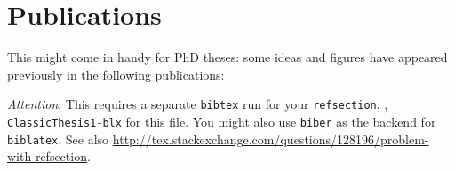 \chapter*{Publications}
This might come in handy for PhD theses: some ideas and figures have appeared previously in the following publications:


\begin{refsection}[ownpubs]
    \small
    \nocite{*} %
    \printbibliography[heading=none]
\end{refsection}

\emph{Attention}: This requires a separate \texttt{bibtex} run for your \texttt{refsection}, \eg, \texttt{ClassicThesis1-blx} for this file.
You might also use \texttt{biber} as the backend for \texttt{biblatex}. See also \url{http://tex.stackexchange.com/questions/128196/problem-with-refsection}.
